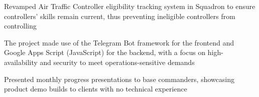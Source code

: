 \begin{cvitemize}
\item Revamped Air Traffic Controller eligibility tracking system in Squadron to ensure controllers’ skills remain current, thus preventing ineligible controllers from controlling
\item The project made use of the Telegram Bot framework for the frontend and Google Apps Script (JavaScript) for the backend, with a focus on high-availability and security to meet operations-sensitive demands
\item Presented monthly progress presentations to base commanders, showcasing product demo builds to clients with no technical experience
\end{cvitemize}